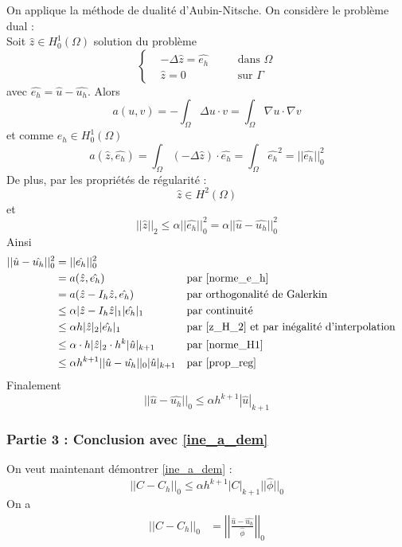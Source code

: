 On applique la méthode de dualité d'Aubin-Nitsche. On considère le problème dual : \\
Soit $\hat{z}\in H_0^1(\Omega)$ solution du problème
$$\left\{\begin{aligned}
	&-\Delta\hat{z}=\hat{e_h} \quad &&\text{dans }\Omega \\
	&\hat{z}=0 \quad &&\text{sur } \Gamma
\end{aligned}\right.$$
avec $\hat{e_h}=\hat{u}-\hat{u_h}$.
Alors
$$a(u,v)=-\int_\Omega\Delta u\cdot v=\int_\Omega\nabla u\cdot\nabla v$$
et comme $e_h\in H_0^1(\Omega)$
\begin{equation}
	a(\hat{z},\hat{e_h})=\int_\Omega(-\Delta \hat{z})\cdot \hat{e_h}=\int_\Omega \hat{e_h}^2=||\hat{e_h}||_0^2
	\label{norme_e_h}
\end{equation}
De plus, par les propriétés de régularité : 
\begin{equation}
	\hat{z}\in H^2(\Omega)
	\label{z_H_2}
\end{equation}
et
\begin{equation}
	||\hat{z}||_2\le \alpha||\hat{e_h}||_0^2 =\alpha||\hat{u}-\hat{u_h}||_0^2
	\label{prop_reg}
\end{equation}
Ainsi
\begin{align*}
	||\hat{u}-\hat{u_h}||_0^2&=||\hat{e_h}||_0^2 \\
	&=a(\hat{z},\hat{e_h}) &&\text{par \ref{norme_e_h}} \\
	&=a(\hat{z}-I_h\hat{z},\hat{e_h}) &&\text{par orthogonalité de Galerkin} \\
	&\le\alpha|\hat{z}-I_h\hat{z}|_1|\hat{e_h}|_1 &&\text{par continuité} \\
	&\le\alpha h|\hat{z}|_2|\hat{e_h}|_1 &&\text{par \ref{z_H_2} et par inégalité d'interpolation} \\
	&\le\alpha \cdot h|\hat{z}|_2 \cdot h^k|\hat{u}|_{k+1} &&\text{par \ref{norme_H1}} \\
	&\le\alpha h^{k+1}||\hat{u}-\hat{u_h}||_0|\hat{u}|_{k+1} &&\text{par \ref{prop_reg}}
\end{align*}
Finalement
\begin{equation}
	\boxed{||\hat{u}-\hat{u_h}||_0\le\alpha h^{k+1}|\hat{u}|_{k+1}}
\end{equation}

\subsubsection{Partie 3 : Conclusion avec \ref{ine_a_dem}}

On veut maintenant démontrer \ref{ine_a_dem} :
$$||C-C_h||_0\le \alpha h^{k+1}|C|_{k+1}||\hat{\phi}||_0$$
On a 
\begin{align*}
	||C-C_h||_0&=\left|\left|\frac{\hat{u}-\hat{u_h}}{\hat{\phi}}\right|\right|_0
\end{align*}

\color{red}{Comment continuer ??}\color{black}


